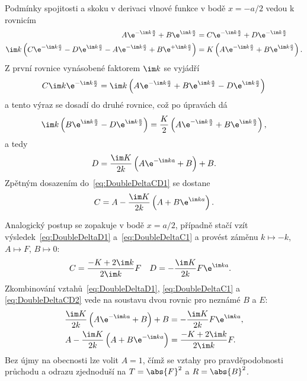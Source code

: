 \begin{solution}
\begin{enumerate}
		Podmínky spojitosti a skoku v derivaci vlnové funkce v bodě $\boxed{x=-a/2}$ vedou k rovnicím
		\begin{subequations}
			\begin{align}
				A\e^{-\im k\frac{a}{2}}+B\e^{\im k\frac{a}{2}}
					&=C\e^{-\im k\frac{a}{2}}+D\e^{-\im k\frac{a}{2}}\\
				\im k\left(C\e^{-\im k\frac{a}{2}}-D\e^{\im k\frac{a}{2}}
					-A\e^{-\im k\frac{a}{2}}+B\e^{+\im k\frac{a}{2}}\right)
					&=K\left(A\e^{-\im k\frac{a}{2}}+B\e^{\im k\frac{a}{2}}\right).		
			\end{align}
		\end{subequations}
		Z první rovnice vynásobené faktorem ${\im k}$ se vyjádří
		\begin{equation}\label{eq:DoubleDeltaCD1}
            C\im k\e^{-\im k\frac{a}{2}}
                =\im k\left(A\e^{-\im k\frac{a}{2}}+B\e^{\im k\frac{a}{2}}-D\e^{\im k\frac{a}{2}}\right)
		\end{equation}
		a tento výraz se dosadí do druhé rovnice, což po úpravách dá
		\begin{equation}
            \im k\left(B\e^{\im k\frac{a}{2}}-D\e^{\im k\frac{a}{2}}\right)
                =\frac{K}{2}\left(A\e^{-\im k\frac{a}{2}}+B\e^{\im k\frac{a}{2}}\right),
		\end{equation}
		a tedy
		\begin{equation}\label{eq:DoubleDeltaD1}
			D=\frac{\im K}{2k}\left(A\e^{-\im ka}+B\right)+B.
		\end{equation}
		Zpětným dosazením do~\eqref{eq:DoubleDeltaCD1} se dostane
		\begin{equation}\label{eq:DoubleDeltaC1}
			C=A-\frac{\im K}{2k}\left(A+B\e^{\im ka}\right).
		\end{equation}
		
		Analogický postup se zopakuje v bodě $\boxed{x=a/2}$, případně stačí vzít výsledek~\eqref{eq:DoubleDeltaD1} 
		a~\eqref{eq:DoubleDeltaC1} a provést záměnu $k\mapsto-k$, $A\mapsto F$, $B\mapsto 0$:
		\begin{align}\label{eq:DoubleDeltaCD2}
			C&=\frac{-K+2\im k}{2\im k}F &
			D&=-\frac{\im K}{2k}F\e^{\im ka}.
		\end{align}
		Zkombinování vztahů~\eqref{eq:DoubleDeltaD1}, \eqref{eq:DoubleDeltaC1} a \eqref{eq:DoubleDeltaCD2} vede na soustavu dvou rovnic pro neznámé $B$ a $E$:
		\begin{subequations}
			\begin{align}
				\frac{\im K}{2k}\left(A\e^{-\im ka}+B\right)+B
					&=-\frac{\im K}{2k}F\e^{\im ka},\\
				A-\frac{\im K}{2k}\left(A+B\e^{-\im ka}\right)
					&=\frac{-K+2\im k}{2\im k}F.
			\end{align}
		\end{subequations}
		Bez újmy na obecnosti lze volit $A=1$, čímž se vztahy pro pravděpodobnosti průchodu a odrazu zjednoduší na $T=\abs{F}^{2}$ a $R=\abs{B}^{2}$.
		

\end{enumerate}
\end{solution}
